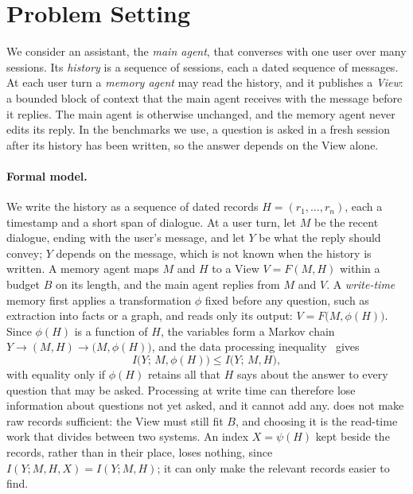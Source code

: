\section{Problem Setting}
\label{sec:setting}

We consider an assistant, the \emph{main agent}, that converses with one user over many sessions.
Its \emph{history} is a sequence of sessions, each a dated sequence of messages.
At each user turn a \emph{memory agent} may read the history, and it publishes a \emph{View}: a bounded block of context that the main agent receives with the message before it replies.
The main agent is otherwise unchanged, and the memory agent never edits its reply.
In the benchmarks we use, a question is asked in a fresh session after its history has been written, so the answer depends on the View alone.

\paragraph{Formal model.}
We write the history as a sequence of dated records $H = (r_1, \ldots, r_n)$, each a timestamp and a short span of dialogue.
At a user turn, let $M$ be the recent dialogue, ending with the user's message, and let $Y$ be what the reply should convey; $Y$ depends on the message, which is not known when the history is written.
A memory agent maps $M$ and $H$ to a View $V = F(M, H)$ within a budget $B$ on its length, and the main agent replies from $M$ and $V$.
A \emph{write-time} memory first applies a transformation $\phi$ fixed before any question, such as extraction into facts or a graph, and reads only its output: $V = F\bigl(M, \phi(H)\bigr)$.
Since $\phi(H)$ is a function of $H$, the variables form a Markov chain $Y \to (M, H) \to \bigl(M, \phi(H)\bigr)$, and the data processing inequality~\citep{cover2006elements} gives
\begin{equation}
\label{eq:dpi}
I\bigl(Y;\, M, \phi(H)\bigr) \le I\bigl(Y;\, M, H\bigr),
\end{equation}
with equality only if $\phi(H)$ retains all that $H$ says about the answer to every question that may be asked.
Processing at write time can therefore lose information about questions not yet asked, and it cannot add any.
 does not make raw records sufficient: the View must still fit $B$, and choosing it is the read-time work that \sys{} divides between two systems.
An index $X = \psi(H)$ kept beside the records, rather than in their place, loses nothing, since $I(Y; M, H, X) = I(Y; M, H)$; it can only make the relevant records easier to find.

